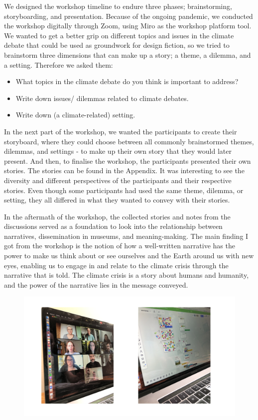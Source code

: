 We designed the workshop timeline to endure three phases; brainstorming, storyboarding, and presentation. Because of the ongoing pandemic, we conducted the workshop digitally through Zoom, using Miro as the workshop platform tool. We wanted to get a better grip on different topics and issues in the climate debate that could be used as groundwork for design fiction, so we tried to brainstorm three dimensions that can make up a story; a theme, a dilemma, and a setting. Therefore we asked them:

\begin{itemize}
    \item What topics in the climate debate do you think is important to address?
    \item Write down issues/ dilemmas related to climate debates.
    \item Write down (a climate-related) setting.
\end{itemize}

In the next part of the workshop, we wanted the participants to create their storyboard, where they could choose between all commonly brainstormed themes, dilemmas, and settings - to make up their own story that they would later present. And then, to finalise the workshop, the participants presented their own stories. The stories can be found in the Appendix. It was interesting to see the diversity and different perspectives of the participants and their respective stories. Even though some participants had used the same theme, dilemma, or setting, they all differed in what they wanted to convey with their stories. 

In the aftermath of the workshop, the collected stories and notes from the discussions served as a foundation to look into the relationship between narratives, dissemination in museums, and meaning-making. The main finding I got from the workshop is the notion of how a well-written narrative has the power to make us think about or see ourselves and the Earth around us with new eyes, enabling us to engage in and relate to the climate crisis through the narrative that is told. The climate crisis is a story about humans and humanity, and the power of the narrative lies in the message conveyed.

\begin{figure}[H]
\includegraphics[width=13cm]{pictures/narrative_workshop.png}
\caption{}
\centering 
\end{figure}

